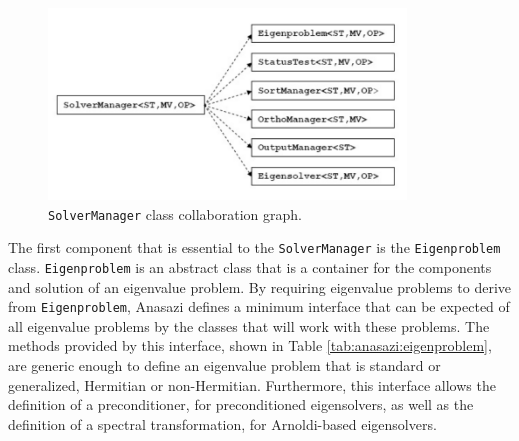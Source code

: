 \documentclass[acmtoms]{acmtrans2m}
\newcommand{\aspace}[1]{\texttt{#1}}
\begin{document}
\begin{figure}[htb]
\label{fig:solverColl}
\begin{center}
\includegraphics[height=2in]{anasazi_slvr_collaborations.pdf}
\end{center}
\caption{\aspace{SolverManager} class collaboration graph.}
\end{figure}

The first component that is essential to the \aspace{SolverManager} is the
\aspace{Eigenproblem} class.  \aspace {Eigenproblem} is an abstract class that is a
container for the components and solution of an eigenvalue problem. By requiring
eigenvalue problems to derive from \aspace{Eigenproblem}, Anasazi defines a minimum
interface that can be expected of all eigenvalue problems by the classes that will work
with these problems. The methods provided by this interface, shown in Table
\ref{tab:anasazi:eigenproblem}, are generic enough to define an eigenvalue problem that is
standard or generalized, Hermitian or non-Hermitian. Furthermore, this interface allows
the definition of a preconditioner, for preconditioned eigensolvers, as well as the
definition of a spectral transformation, for Arnoldi-based eigensolvers. 
\end{document}

